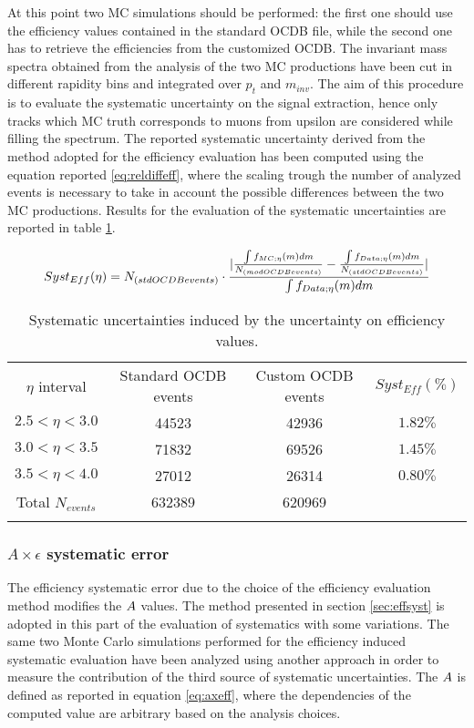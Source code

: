 At this point two MC simulations should be performed: the first one should use the efficiency values contained in the standard OCDB file, while the second one has to retrieve the efficiencies from the customized OCDB. The invariant mass spectra obtained from the analysis of the two MC productions have been cut in different rapidity bins and integrated over $p_t$ and $m_{inv}$. The aim of this procedure is to evaluate the systematic uncertainty on the signal extraction, hence only tracks which MC truth corresponds to muons from upsilon are considered while filling the spectrum. The reported systematic uncertainty derived from the method adopted for the efficiency evaluation has been computed using the equation reported \ref{eq:reldiffeff}, where the scaling trough the number of analyzed events is necessary to take in account the possible differences between the two MC productions. Results for the evaluation of the systematic uncertainties are reported in table \ref{tab:systEff}.

\begin{equation}\label{eq:reldiffeff}
	Syst_{Eff}(\eta)=N_{\text(std OCDB events)}\cdot \frac{\lvert\frac{\int{f_{MC;\eta}(m)dm}}{N_{\text(mod OCDB events)}}-\frac{\int{f_{Data;\eta}(m)dm}}{N_{\text(std OCDB events)}}\rvert}{\int{f_{Data;\eta}(m)dm}}
\end{equation}


\begin{table}[!htb]
\centering
\begin{tabular}{|c|c|c|c|}
 \hline
 $\eta$ interval& Standard OCDB events & Custom OCDB events & $Syst_{Eff} (\%)$  \\
 \hhline{|=|=|=|=|}
 $2.5<\eta<3.0$& 44523 & 42936 &$1.82\%$  \\
 \hline
 $3.0<\eta<3.5$& 71832 & 69526 &$1.45\%$  \\
 \hline
 $3.5<\eta<4.0$& 27012 & 26314 &$0.80\%$  \\
 \hhline{|=|=|=|=|}
 Total $N_{events}$& 632389 & 620969 & \multicolumn{1}{c}{} \\
 \hhline{|-|-|-|}
\end{tabular}
\caption{Systematic uncertainties induced by the uncertainty on efficiency values.}
\label{tab:systEff}
\end{table}


\subsubsection{$A\times\epsilon$ systematic error}
The efficiency systematic error due to the choice of the efficiency evaluation method modifies the $A\time\epsilon$ values. The method presented in section \ref{sec:effsyst} is adopted in this part of the evaluation of systematics with some variations. The same two Monte Carlo simulations performed for the efficiency induced systematic evaluation have been analyzed using another approach in order to measure the contribution of the third source of systematic uncertainties. The $A\time\epsilon$ is defined as reported in equation \ref{eq:axeff}, where the dependencies of the computed value are arbitrary based on the analysis choices.

